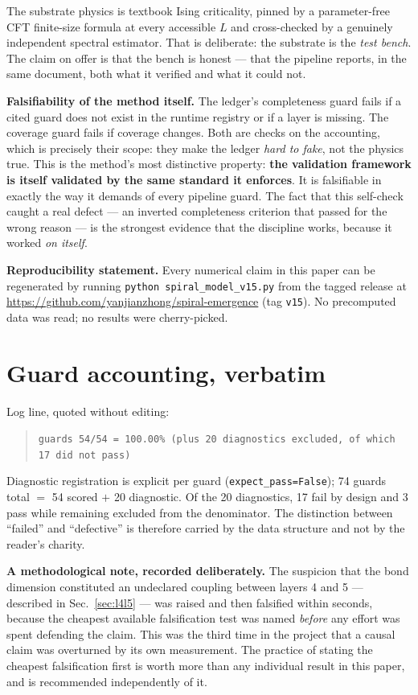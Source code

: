 \documentclass[11pt,a4paper]{article}
\newcommand{\code}[1]{\texttt{\small #1}}
\begin{document}
The substrate physics is textbook Ising criticality, pinned by a parameter-free CFT
finite-size formula at every accessible $L$ and cross-checked by a genuinely
independent spectral estimator. That is deliberate: the substrate is the
\emph{test bench}. The claim on offer is that the bench is honest --- that the
pipeline reports, in the same document, both what it verified and what it could not.

\medskip
\noindent\textbf{Falsifiability of the method itself.}
The ledger's completeness guard fails if a cited guard does not exist in the
runtime registry or if a layer is missing. The coverage guard fails if coverage
changes. Both are checks on the accounting, which is precisely their scope: they
make the ledger \emph{hard to fake}, not the physics true. This is the method's
most distinctive property: \textbf{the validation framework is itself validated
by the same standard it enforces}. It is falsifiable in exactly the way it
demands of every pipeline guard. The fact that this self-check caught a real
defect --- an inverted completeness criterion that passed for the wrong reason
--- is the strongest evidence that the discipline works, because it worked
\emph{on itself}.

\medskip
\noindent\textbf{Reproducibility statement.} Every numerical claim in this
paper can be regenerated by running \code{python spiral\_model\_v15.py}
from the tagged release at
\url{https://github.com/yanjianzhong/spiral-emergence} (tag \texttt{v15}).
No precomputed data was read; no results were cherry-picked.

\appendix
\section{Guard accounting, verbatim}
\label{app:accounting}

\noindent Log line, quoted without editing:
\begin{quote}
\code{guards 54/54 = 100.00\% (plus 20 diagnostics excluded, of which 17 did not
pass)}
\end{quote}

\noindent Diagnostic registration is explicit per guard (\code{expect\_pass=False});
74 guards total $=$ 54 scored $+$ 20 diagnostic. Of the 20 diagnostics, 17 fail by
design and 3 pass while remaining excluded from the denominator. The distinction
between ``failed'' and ``defective'' is therefore carried by the data structure and
not by the reader's charity.

\medskip
\noindent\textbf{A methodological note, recorded deliberately.} The suspicion that
the bond dimension constituted an undeclared coupling between layers 4 and 5 ---
described in Sec.~\ref{sec:l4l5} --- was raised and then falsified within seconds,
because the cheapest available falsification test was named \emph{before} any
effort was spent defending the claim. This was the third time in the project that a
causal claim was overturned by its own measurement. The practice of stating the
cheapest falsification first is worth more than any individual result in this paper,
and is recommended independently of it.



\end{document}
